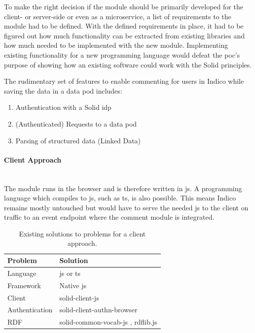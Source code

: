 To make the right decision if the module should be primarily developed for the client- or server-side or even as a microservice, a list of requirements to the module had to be defined. With the defined requirements in place, it had to be figured out how much functionality can be extracted from existing libraries and how much needed to be implemented with the new module. Implementing existing functionality for a new programming language would defeat the \gls{poc}’s purpose of showing how an existing software could work with the Solid principles.

The rudimentary set of features to enable commenting for users in Indico while saving the data in a data pod includes: 
\begin{enumerate}
    \item Authentication with a Solid \gls{idp}
    \item (Authenticated) Requests to a data pod
    \item Parsing of structured data (Linked Data)
\end{enumerate}
\vspace{0.5cm}
\paragraph{Client Approach}\mbox{}\\

The module runs in the browser and is therefore written in \gls{js}. A programming language which compiles to \gls{js}, such as \gls{ts}, is also possible. This means Indico remains mostly untouched but would have to serve the needed \gls{js} to the client on traffic to an event endpoint where the comment module is integrated.

\begin{table}[h!]
    \centering
    \begin{tabular}{| l | l |} 
     \hline
     Problem & Solution \\
     \hline
      Language & \gls{js} or \gls{ts}  \\
      Framework & Native \gls{js}  \\
      Client & solid-client-js \cite{solid-client-js}  \\
      Authentication & solid-client-authn-browser \cite{solid-client-authn-browser} \\
      RDF & solid-common-vocab-js \cite{solid-common-vocab-js}, rdflib.js \cite{rdflib.js}  \\
     \hline
    \end{tabular}
    \vspace{0.75cm}
    \caption{Existing solutions to problems for a client approach.}
    \label{table:1}
\end{table}


